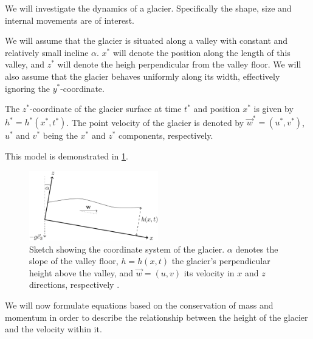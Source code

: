 We will investigate the dynamics of a glacier. Specifically the shape, size and internal movements are of interest.

We will assume that the glacier is situated along a valley with constant and relatively small incline $\alpha$. $x^*$ will denote the position along the length of this valley, and $z^*$ will denote the heigh perpendicular from the valley floor. We will also assume that the glacier behaves uniformly along its width, effectively ignoring the $y^*$-coordinate.

The $z^*$-coordinate of the glacier surface at time $t^*$ and position $x^*$ is given by $h^* = h^*(x^*, t^*)$. The point velocity of the glacier is denoted by $\vec{w}^* = (u^*, v^*)$, $u^*$ and $v^*$ being the $x^*$ and $z^*$ components, respectively.

This model is demonstrated in \figurename{ \ref{fig:coordinate_system}}.

\begin{figure}
  \centering
    \includegraphics[width=0.5\textwidth]{images/coordinate_system.png}
  \caption{Sketch showing the coordinate system of the glacier. $\alpha$ denotes the slope of the valley floor, $h = h(x, t)$ the glacier's perpendicular height above the valley, and $\vec{w} = (u, v)$ its velocity in $x$ and $z$ directions, respectively \cite{project-description}.}
  \label{fig:coordinate_system}
\end{figure}

We will now formulate equations based on the conservation of mass and momentum in order to describe the relationship between the height of the glacier and the velocity within it.

